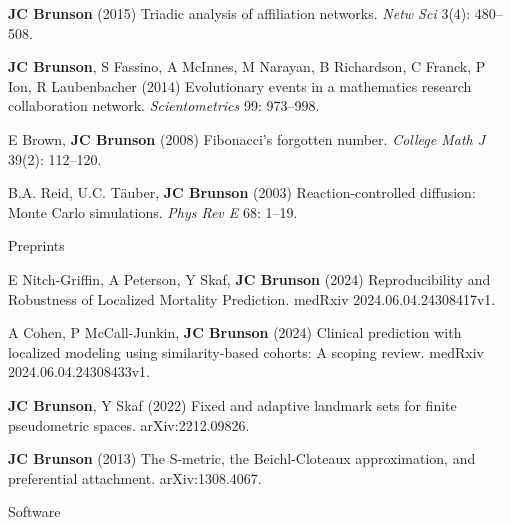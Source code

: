 \documentclass[10pt,a4paper]{article}
\begin{document}
\begin{enumerate}[label={[\arabic*]},labelindent=1cm,nolistsep]
\item
{\bfseries JC Brunson} (2015) Triadic analysis of affiliation networks. {\itshape Netw Sci} 3(4): 480--508.
\item
{\bfseries JC Brunson}, S Fassino, A McInnes, M Narayan, B Richardson, C Franck, P Ion, R Laubenbacher (2014) Evolutionary events in a mathematics research collaboration network. {\itshape Scientometrics} 99: 973--998.
\item
E Brown, {\bfseries JC Brunson} (2008) Fibonacci's forgotten number. {\itshape College Math J} 39(2): 112--120.
\item
B.A. Reid, U.C. T\"{a}uber, {\bfseries JC Brunson} (2003) Reaction-controlled diffusion: Monte Carlo simulations. {\itshape Phys Rev E} 68: 1--19.
\setcounter{paper}{\value{enumi}}
\end{enumerate}
%
\vspace{.25cm}
{\sc Preprints}
\begin{enumerate}[label={[\arabic*]},labelindent=1cm,nolistsep]
\setcounter{enumi}{\value{paper}}
\item
E Nitch-Griffin, A Peterson, Y Skaf, {\bfseries JC Brunson} (2024) Reproducibility and Robustness of Localized Mortality Prediction. medRxiv 2024.06.04.24308417v1.
\item
A Cohen, P McCall-Junkin, {\bfseries JC Brunson} (2024) Clinical prediction with localized modeling using similarity-based cohorts: A scoping review. medRxiv 2024.06.04.24308433v1.
\item
{\bfseries JC Brunson}, Y Skaf (2022) Fixed and adaptive landmark sets for finite pseudometric spaces. arXiv:2212.09826.
\item
{\bfseries JC Brunson} (2013) The S-metric, the Beichl-Cloteaux approximation, and preferential attachment. arXiv:1308.4067.
\setcounter{paper}{\value{enumi}}
\end{enumerate}
%
\vspace{.25cm}
{\sc Software}
\end{document}
